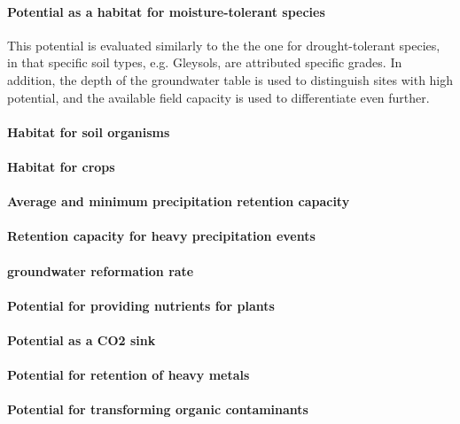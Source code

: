 \documentclass[preprint,12pt,authoryear]{elsarticle}
\begin{document}
\paragraph{Potential as a habitat for moisture-tolerant species}
This potential is evaluated similarly to the the one for drought-tolerant species, in that specific soil types, e.g. Gleysols, are attributed specific grades. In addition, the depth of the groundwater table is used to distinguish sites with high potential, and the available field capacity is used to differentiate even further.
\paragraph{Habitat for soil organisms}

\paragraph{Habitat for crops}

\paragraph{Average and minimum precipitation retention capacity}

\paragraph{Retention capacity for heavy precipitation events}
 
 
\paragraph{groundwater reformation rate}


\paragraph{Potential for providing nutrients for plants}

\paragraph{Potential as a CO2 sink}

\paragraph{Potential for retention of heavy metals}

\paragraph{Potential for transforming organic contaminants}
\end{document}

